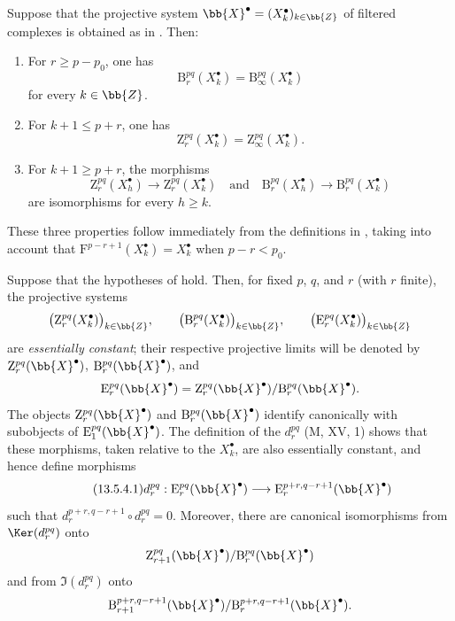 \begin{lemma}[13.5.3]
\label{0.13.5.3}
Suppose that the projective system
$\bb{X}^\bullet=(X^\bullet_k)_{k\in\bb{Z}}$ of filtered complexes is
obtained as in . Then:
\begin{enumerate}
  \item[{\rm a)}] For $r\geq p-p_0$, one has
  \[
    \mathrm{B}_r^{pq}(X^\bullet_k)
    =
    \mathrm{B}_\infty^{pq}(X^\bullet_k)
  \]
  for every $k\in\bb{Z}$.
  \item[{\rm b)}] For $k+1\leq p+r$, one has
  \[
    \mathrm{Z}_r^{pq}(X^\bullet_k)
    =
    \mathrm{Z}_\infty^{pq}(X^\bullet_k).
  \]
  \item[{\rm c)}] For $k+1\geq p+r$, the morphisms
  \[
    \mathrm{Z}_r^{pq}(X^\bullet_h)
    \longrightarrow
    \mathrm{Z}_r^{pq}(X^\bullet_k)
    \quad\text{and}\quad
    \mathrm{B}_r^{pq}(X^\bullet_h)
    \longrightarrow
    \mathrm{B}_r^{pq}(X^\bullet_k)
  \]
  are isomorphisms for every $h\geq k$.
\end{enumerate}
\end{lemma}

These three properties follow immediately from the definitions in
, taking into account that
$\mathrm{F}^{p-r+1}(X^\bullet_k)=X^\bullet_k$ when $p-r<p_0$.

\begin{env}[13.5.4]
\label{0.13.5.4}
Suppose that the hypotheses of  hold.
Then, for fixed $p$, $q$, and $r$ (with $r$ finite), the projective
systems
\[
  \bigl(\mathrm{Z}_r^{pq}(X^\bullet_k)\bigr)_{k\in\bb{Z}},
  \qquad
  \bigl(\mathrm{B}_r^{pq}(X^\bullet_k)\bigr)_{k\in\bb{Z}},
  \qquad
  \bigl(\mathrm{E}_r^{pq}(X^\bullet_k)\bigr)_{k\in\bb{Z}}
\]
are \emph{essentially constant}; their respective projective limits
will be denoted by
$\mathrm{Z}_r^{pq}(\bb{X}^\bullet)$,
$\mathrm{B}_r^{pq}(\bb{X}^\bullet)$, and
\[
  \mathrm{E}_r^{pq}(\bb{X}^\bullet)
  =
  \mathrm{Z}_r^{pq}(\bb{X}^\bullet)/
  \mathrm{B}_r^{pq}(\bb{X}^\bullet).
\]
The objects $\mathrm{Z}_r^{pq}(\bb{X}^\bullet)$ and
$\mathrm{B}_r^{pq}(\bb{X}^\bullet)$ identify canonically with
subobjects of $\mathrm{E}_1^{pq}(\bb{X}^\bullet)$.
The definition of the $d_r^{pq}$ (M, XV, 1) shows that these
morphisms, taken relative to the $X^\bullet_k$, are also essentially
constant, and hence define morphisms
\begin{equation}
\label{0.13.5.4.1}
\tag{13.5.4.1}
  d_r^{pq}:
  \mathrm{E}_r^{pq}(\bb{X}^\bullet)
  \longrightarrow
  \mathrm{E}_r^{p+r,q-r+1}(\bb{X}^\bullet)
\end{equation}
such that
$d_r^{p+r,q-r+1}\circ d_r^{pq}=0$.
Moreover, there are canonical isomorphisms from
$\Ker(d_r^{pq})$ onto
\[
  \mathrm{Z}_{r+1}^{pq}(\bb{X}^\bullet)/
  \mathrm{B}_r^{pq}(\bb{X}^\bullet)
\]
and from $\Im(d_r^{pq})$ onto
\[
  \mathrm{B}_{r+1}^{p+r,q-r+1}(\bb{X}^\bullet)/
  \mathrm{B}_r^{p+r,q-r+1}(\bb{X}^\bullet).
\]
\end{env}

